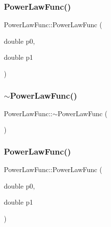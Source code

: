 \subsubsection{\texorpdfstring{PowerLawFunc()}{PowerLawFunc()}\hspace{0.1cm}{\footnotesize\ttfamily [1/2]}}
{\footnotesize\ttfamily Power\+Law\+Func\+::\+Power\+Law\+Func (\begin{DoxyParamCaption}\item[{double}]{p0,  }\item[{double}]{p1 }\end{DoxyParamCaption})\hspace{0.3cm}{\ttfamily [inline]}}

\mbox{\label{classPowerLawFunc_a596daf259340179e1b3dc82e00569135}} 
\subsubsection{\texorpdfstring{$\sim$PowerLawFunc()}{~PowerLawFunc()}\hspace{0.1cm}{\footnotesize\ttfamily [1/2]}}
{\footnotesize\ttfamily Power\+Law\+Func\+::$\sim$\+Power\+Law\+Func (\begin{DoxyParamCaption}{ }\end{DoxyParamCaption})\hspace{0.3cm}{\ttfamily [inline]}}

\mbox{\label{classPowerLawFunc_a9b7b99c69d48448d65f76d7cc2ba3dfc}} 
\subsubsection{\texorpdfstring{PowerLawFunc()}{PowerLawFunc()}\hspace{0.1cm}{\footnotesize\ttfamily [2/2]}}
{\footnotesize\ttfamily Power\+Law\+Func\+::\+Power\+Law\+Func (\begin{DoxyParamCaption}\item[{double}]{p0,  }\item[{double}]{p1 }\end{DoxyParamCaption})\hspace{0.3cm}{\ttfamily [inline]}}

